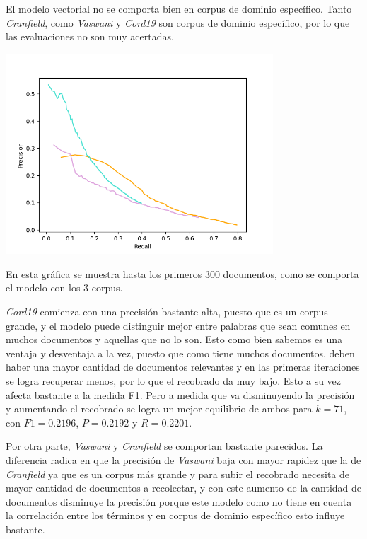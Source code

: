 \documentclass{llncs}
\begin{document}
    El modelo vectorial no se comporta bien en corpus de dominio específico. Tanto \emph{Cranfield}, como \emph{Vaswani} y \emph{Cord19} son corpus de dominio específico, por lo que las evaluaciones no son muy acertadas.

    \begin{center}
        \includegraphics[width=10cm]{PR_plot(k=300).png}  
    \end{center}

    En esta gráfica se muestra hasta los primeros 300 documentos, como se comporta el modelo con los 3 corpus. 
        
    \emph{Cord19} comienza con una precisión bastante alta, puesto que es un corpus grande, y el modelo puede distinguir mejor entre palabras que sean comunes en muchos documentos y aquellas que no lo son. Esto como bien sabemos es una ventaja y desventaja a la vez, puesto que como tiene muchos documentos, deben haber una mayor cantidad de documentos relevantes y en las primeras iteraciones se logra recuperar menos, por lo que el recobrado da muy bajo. Esto a su vez afecta bastante a la medida F1. Pero a medida que va disminuyendo la precisión y aumentando el recobrado se logra un mejor equilibrio de ambos para $k = 71$, con $F1=0.2196$, $P=0.2192$ y $R=0.2201$.

    Por otra parte, \emph{Vaswani} y \emph{Cranfield} se comportan bastante parecidos. La diferencia radica en que la precisión de \emph{Vaswani} baja con mayor rapidez que la de \emph{Cranfield} ya que es un corpus más grande y para subir el recobrado necesita de mayor cantidad de documentos a recolectar, y con este aumento de la cantidad de documentos disminuye la precisión porque este modelo como no tiene en cuenta la correlación entre los términos y en corpus de dominio específico esto influye bastante. 
        
\end{document}
